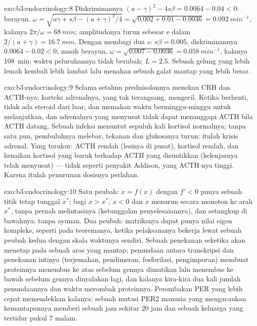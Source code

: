 \begin{solution}{exo:b3:endocrinology:8}
Diskriminannya $(a - \gamma)^{2} - 4s\beta = 0.0064 - 0.04 < 0$:
berayun. $\omega = \sqrt{a\gamma + s\beta - (a+\gamma)^{2}/4} =
\sqrt{0.002 + 0.01 - 0.0036} = \qty{0.092}{min^{-1}}$, kalanya $2\pi/
\omega = \qty{68}{min}$; amplitudonya turun sebesar $\mathrm{e}$ dalam $2/(a +
\gamma) = \qty{16.7}{min}$. Dengan membagi dua $s$: $s\beta = 0.005$, diskriminannya
$0.0064 - 0.02 < 0$, masih berayun, $\omega = \sqrt{0.007 - 0.0036}
= \qty{0.058}{min^{-1}}$, kalanya \qty{108}{min}; waktu peluruhannya
tidak berubah; $L = 2.5$. Sebuah gelung yang lebih lemah kembali lebih lambat lalu menahan sebuah
galat mantap yang lebih besar.
\end{solution}

\begin{solution}{exo:b3:endocrinology:9}
Selama setahun prednisolonnya menekan CRH dan ACTH-nya; korteks
adrenalnya, yang tak terangsang, mengecil. Ketika berhenti, tidak ada steroid dari
luar,  dan  memakan waktu berminggu-minggu untuk melanjutkan, dan
adrenalnya yang menyusut tidak dapat menanggapi ACTH bila ACTH datang. Sebuah infeksi
menuntut sepuluh kali kortisol normalnya; tanpa satu pun, pembuluhnya melebar,
tekanan dan glukosanya turun: itulah krisis adrenal. Yang terukur: ACTH rendah (lesinya
di pusat), kortisol rendah, dan kenaikan kortisol yang buruk terhadap ACTH yang
disuntikkan (kelenjarnya telah menyusut) --- tidak seperti penyakit Addison, yang ACTH-nya
tinggi. Karena itulah penurunan dosisnya perlahan.
\end{solution}

\begin{solution}{exo:b3:endocrinology:10}
Satu peubah: $\dot x = f(x)$ dengan $f' < 0$ punya sebuah titik tetap tunggal
$x^{*}$; bagi $x > x^{*}$, $\dot x < 0$ dan $x$ menurun secara monoton
ke arah $x^{*}$, tanpa pernah melintasinya (ketunggalan penyelesaiannya), dan
setangkup di bawahnya: tanpa ayunan. Dua peubah: matriksnya dapat punya
nilai eigen kompleks, seperti pada teoremanya, ketika pelaksananya bekerja lewat
sebuah peubah kedua dengan skala waktunya sendiri. Sebuah penekanan seketika
akan menetap pada sebuah aras yang mantap; penundaan antara transkripsi dan
penekanan intinya (terjemahan, pendimeran, fosforilasi, pengimporan)
membuat proteinnya menembus ke atas sebelum gennya dimatikan lalu menembus ke bawah
sebelum gennya dinyalakan lagi, dan kalanya kira-kira dua kali jumlah
penundaannya dan waktu merombak proteinnya. Perombakan PER yang lebih cepat
memendekkan kalanya: sebuah mutasi PER2 manusia yang mengacaukan kemantapannya memberi sebuah
jam sekitar 20 jam dan sebuah keluarga yang tertidur pukul 7 malam.
\end{solution}

